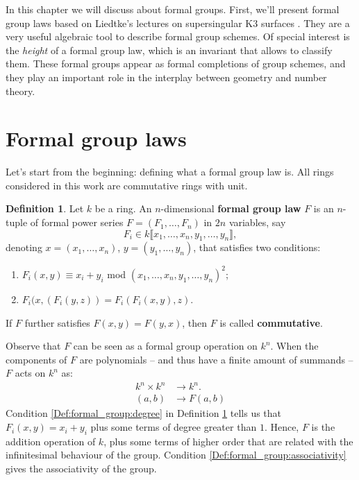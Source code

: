 \documentclass{report}
\theoremstyle{definition}
\newtheorem{definition}[theorem]{Definition}
\begin{document}
In this chapter we will discuss about formal groups. First, we'll present formal group laws based on Liedtke's lectures on supersingular K3 surfaces \cite[Section~6.1]{liedtke2016lectures}. They are a very useful algebraic tool to describe formal group schemes. Of special interest is the \emph{height} of a formal group law, which is an invariant that allows to classify them. These formal groups appear as formal completions of group schemes, and they play an important role in the interplay between geometry and number theory.

\section{Formal group laws}

Let's start from the beginning: defining what a formal group law is. All rings considered in this work are commutative rings with unit.

\begin{definition}
\label{Def:formal_group}
Let $k$ be a ring. An $n$-dimensional \textbf{formal group law} $F$ is an $n$-tuple of formal power series $F=(F_1,\ldots,F_n)$ in $2n$ variables, say
\[F_i\in k\llbracket x_1,\ldots,x_n,y_1,\ldots,y_n\rrbracket,\]
denoting $x=(x_1,\ldots,x_n)$, $y=(y_1,\ldots,y_n)$, that satisfies two conditions:
\begin{enumerate}
\item\label{Def:formal_group:degree} $F_i(x,y)\equiv x_i+y_i$ mod $(x_1,\ldots,x_n,y_1,\ldots,y_n)^2$;
\item\label{Def:formal_group:associativity} $F_i(x,(F_i(y,z))=F_i(F_i(x,y),z)$.
\end{enumerate}

If $F$ further satisfies $F(x,y)=F(y,x)$, then $F$ is called \textbf{commutative}.
\end{definition}

Observe that $F$ can be seen as a formal group operation on $k^n$. When the components of $F$ are polynomials -- and thus have a finite amount of summands -- $F$ acts on $k^n$ as:
\begin{align*}
k^n\times k^n&\longrightarrow k^n.\\
(a,b)&\longrightarrow F(a,b)
\end{align*}
Condition \ref{Def:formal_group:degree} in Definition \ref{Def:formal_group} tells us that $F_i(x,y)=x_i+y_i$ plus some terms of degree greater than $1$. Hence, $F$ is the addition operation of $k$, plus some terms of higher order that are related with the infinitesimal behaviour of the group. Condition \ref{Def:formal_group:associativity} gives the associativity of the group.
\end{document}
